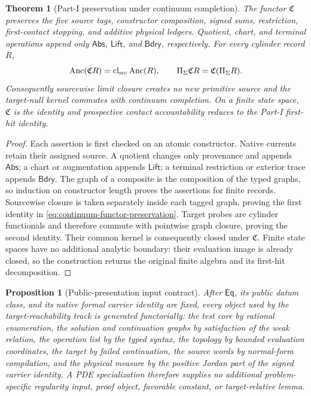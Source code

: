 \documentclass[11pt]{article}
\numberwithin{section}{part}
\theoremstyle{plain}
\newtheorem{theorem}{Theorem}[section]
\newtheorem{proposition}[proposition]{Proposition}
\theoremstyle{definition}
\theoremstyle{remark}
\newcommand{\Abs}{\mathsf{Abs}}
\newcommand{\Lift}{\mathsf{Lift}}
\newcommand{\Bdry}{\mathsf{Bdry}}
\newcommand{\Anc}{\operatorname{Anc}}
\begin{document}
\begin{theorem}[Part-I preservation under continuum completion]
\label{thm:part-i-continuum-preservation}
The functor \(\mathfrak C\) preserves the five source tags, constructor
composition, signed sums, restriction, first-contact stopping, and additive
physical ledgers.  Quotient, chart, and terminal operations append only
\(\Abs\), \(\Lift\), and \(\Bdry\), respectively.  For every cylinder record
\(R\),
\begin{equation}
 \label{eq:continuum-functor-preservation}
 \Anc(\mathfrak C R)
 =\operatorname{cl}_{\rm src}\Anc(R),
 \qquad
 \Pi_\Sigma\mathfrak C R
 =\mathfrak C(\Pi_\Sigma R).
\end{equation}
Consequently sourcewise limit closure creates no new primitive source and the
target-null kernel commutes with continuum completion.  On a finite state
space, \(\mathfrak C\) is the identity and prospective contact accountability
reduces to the Part-I first-hit identity.
\end{theorem}

\begin{proof}
Each assertion is first checked on an atomic constructor.  Native currents
retain their assigned source.  A quotient changes only provenance and appends
\(\Abs\); a chart or augmentation appends \(\Lift\); a terminal restriction
or exterior trace appends \(\Bdry\).  The graph of a composite is the
composition of the typed graphs, so induction on constructor length proves
the assertions for finite records.  Sourcewise closure is taken separately
inside each tagged graph, proving the first identity in
\eqref{eq:continuum-functor-preservation}.  Target probes are cylinder
functionals and therefore commute with pointwise graph closure, proving the
second identity.  Their common kernel is consequently closed under
\(\mathfrak C\).  Finite state spaces have no additional analytic boundary:
their evaluation image is already closed, so the construction returns the
original finite algebra and its first-hit decomposition.
\end{proof}

\begin{proposition}[Public-presentation input contract]
\label{prop:public-presentation-contract}
After \(\mathsf{Eq}\), its public datum class, and its native formal carrier
identity are fixed, every object used by the target-reachability track is
generated functorially: the test core by rational enumeration, the solution
and continuation graphs by satisfaction of the weak relation, the operation
list by the typed syntax, the topology by bounded evaluation coordinates, the
target by failed continuation, the source words by normal-form compilation,
and the physical measure by the positive Jordan part of the signed carrier
identity.  A PDE specialization therefore supplies no additional
problem-specific regularity input, proof object, favorable constant, or
target-relative lemma.
\end{proposition}
\end{document}
